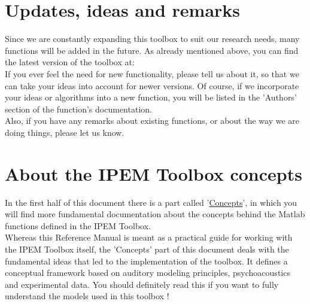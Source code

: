\section{Updates, ideas and remarks}

Since we are constantly expanding this toolbox to suit our research needs,
many functions will be added in the future. As already mentioned above, you
can find the latest version of the toolbox at:
\\

If you ever feel the need for new functionality, please tell us about it, so
that we can take your ideas into account for newer versions. Of course, if we
incorporate your ideas or algorithms into a new function, you will be listed
in the 'Authors' section of the function's documentation.\\

Also, if you have any remarks about existing functions, or about the way we
are doing things, please let us know.


\section{About the IPEM Toolbox concepts}

In the first half of this document there is a part called '\hyperlink{Part:Concepts}{Concepts}',
in which you will find more fundamental documentation about the
concepts behind the Matlab functions defined in the IPEM Toolbox.\\

Whereas this Reference Manual is meant as a practical guide for working with
the IPEM Toolbox itself, the 'Concepts' part of this document deals with the
fundamental ideas that led to the implementation of the toolbox. It defines a
conceptual framework based on auditory modeling principles, psychoacoustics
and experimental data. You should definitely read this if you want
to fully understand the models used in this toolbox !\\
